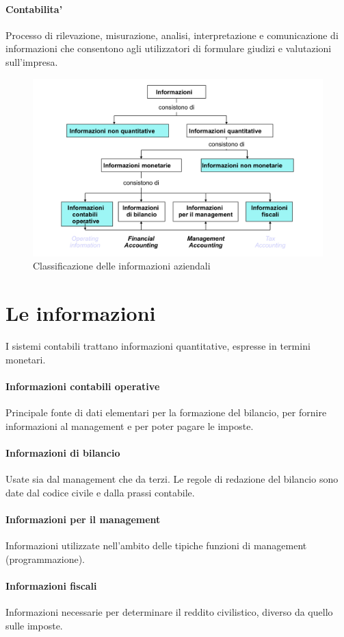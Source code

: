\documentclass{report}
\begin{document}
	\paragraph{Contabilita'} Processo di rilevazione, misurazione, analisi, interpretazione e comunicazione di informazioni che consentono agli utilizzatori di formulare giudizi e valutazioni sull'impresa.
	\begin{figure}[h]
		\centering
		\includegraphics[width=0.7\linewidth]{classificazione-informazioni}
		\caption{Classificazione delle informazioni aziendali}
		\label{fig:classificazione-informazioni}
	\end{figure}
	\section{Le informazioni} I sistemi contabili trattano informazioni quantitative, espresse in termini monetari.
	\paragraph{Informazioni contabili operative} Principale fonte di dati elementari per la formazione del bilancio, per fornire informazioni al management e per poter pagare le imposte.
	\paragraph{Informazioni di bilancio} Usate sia dal management che da terzi. Le regole di redazione del bilancio sono date dal codice civile e dalla prassi contabile.
	\paragraph{Informazioni per il management} Informazioni utilizzate nell'ambito delle tipiche funzioni di management (programmazione).
	\paragraph{Informazioni fiscali} Informazioni necessarie per determinare il reddito civilistico, diverso da quello sulle imposte.
\end{document}
